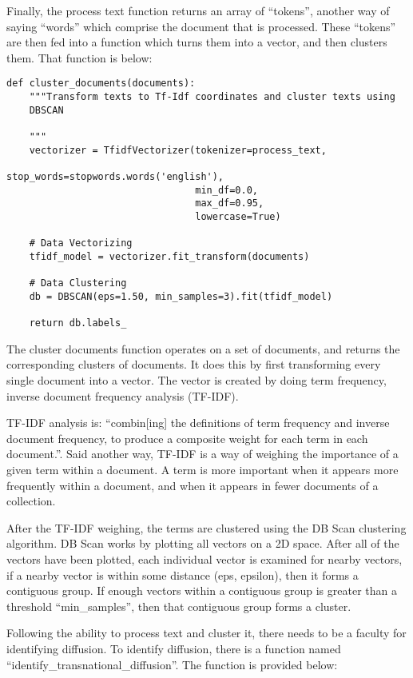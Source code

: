 Finally, the process text function returns an array of ``tokens'',
another way of saying ``words'' which comprise the document that is
processed. These ``tokens'' are then fed into a function which
turns them into a vector, and then clusters them. That function
is below:
  
\begin{lstlisting}
def cluster_documents(documents):
    """Transform texts to Tf-Idf coordinates and cluster texts using
    DBSCAN
    
    """
    vectorizer = TfidfVectorizer(tokenizer=process_text,
                                 stop_words=stopwords.words('english'),
                                 min_df=0.0,
                                 max_df=0.95,
                                 lowercase=True)
    
    # Data Vectorizing
    tfidf_model = vectorizer.fit_transform(documents)
    
    # Data Clustering
    db = DBSCAN(eps=1.50, min_samples=3).fit(tfidf_model)
    
    return db.labels_
\end{lstlisting}

The cluster documents function operates on a set of documents, and
returns the corresponding clusters of documents. It does this by first
transforming every single document into a vector. The vector is created
by doing term frequency, inverse document frequency analysis (TF-IDF).

TF-IDF analysis is: ``combin[ing] the definitions of term frequency
and inverse document frequency, to produce a composite weight for each
term in each document.''.\cite{informationretrieval} Said another way,
TF-IDF is a way of weighing the importance of a given term within a
document. A term is more important when it appears more frequently
within a document, and when it appears in fewer documents of a
collection.

After the TF-IDF weighing, the terms are clustered using the DB Scan
clustering algorithm. DB Scan works by plotting all vectors on a 2D
space. After all of the vectors have been plotted, each individual
vector is examined for nearby vectors, if a nearby vector is within
some distance (eps, epsilon), then it forms a contiguous group. If
enough vectors within a contiguous group is greater than a threshold
``min\_samples'', then that contiguous group forms a cluster.

Following the ability to process text and cluster it, there needs to
be a faculty for identifying diffusion. To identify diffusion, there
is a function named ``identify\_transnational\_diffusion''. The
function is provided below:

